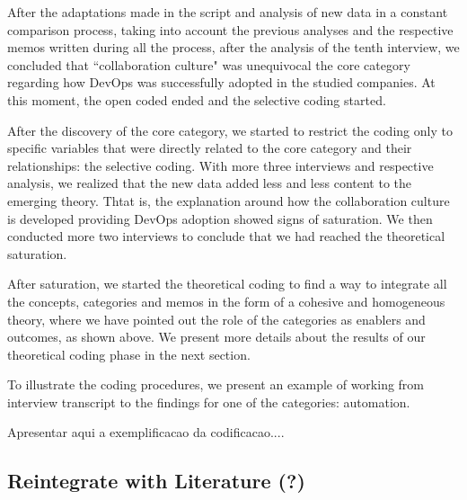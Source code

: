 After the adaptations made in the script and analysis of new data in a constant
comparison process, taking into account the previous analyses and the
respective memos written during all the process, after the analysis of the tenth
interview, we concluded that ``collaboration culture" was unequivocal the core
category regarding how DevOps was successfully adopted in the studied companies.
At this moment, the open coded ended and the selective coding started.

After the discovery of the core category, we started to restrict the coding only
to specific variables that were directly related to the core category and their
relationships: the selective coding.
With more three interviews and respective analysis, we realized that
the new data added less and less content to the emerging theory. Thtat is, the
explanation around how the collaboration culture is developed providing
DevOps adoption showed signs of saturation. We then conducted more two
interviews to conclude that we had reached the theoretical saturation.

After saturation, we started the theoretical coding to find a way to integrate
all the concepts, categories and memos in the form of a cohesive and
homogeneous theory, where we have pointed out the role of the categories as
enablers and outcomes, as shown above. We present more details about 
the results of our theoretical coding phase in the next section. 


To illustrate the coding procedures, we present an example of working from
interview transcript to the findings for one of the categories: automation.


Apresentar aqui a exemplificacao da codificacao....

\subsection{Reintegrate with Literature (?)}
